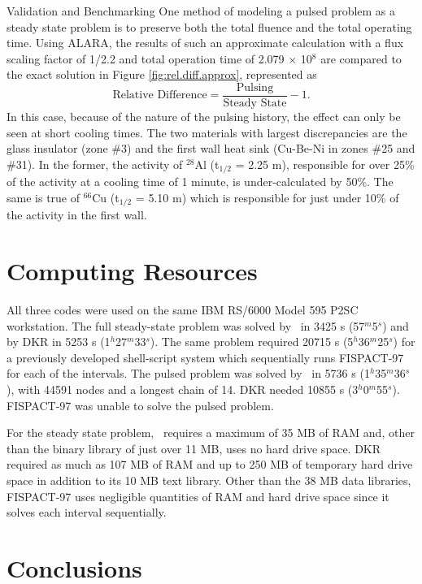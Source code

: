 \begin{chapter}{Validation and Benchmarking}
One method of modeling a pulsed problem as a steady state problem is
to preserve both the total fluence and the total operating
time\cite{bib:sisolak,bib:hosny,bib:qingming}.  Using ALARA, the
results of such an approximate calculation with a flux scaling factor
of 1/2.2 and total operation time of 2.079 $\times$ 10$^8$ are
compared to the exact solution in Figure \ref{fig:rel.diff.approx},
represented as
$$\mbox{Relative Difference} = \frac{\mbox{Pulsing}}{\mbox{Steady
    State}} - 1.$$
In this case, because of the nature of the pulsing history, the effect
can only be seen at short cooling times.  The two materials with
largest discrepancies are the glass insulator (zone \#3) and the first
wall heat sink (Cu-Be-Ni in zones \#25 and \#31).  In the former, the
activity of $^{28}$Al (t$_{1/2}$ = 2.25 m), responsible for over 25\%
of the activity at a cooling time of 1 minute, is under-calculated by
50\%.  The same is true of $^{66}$Cu (t$_{1/2}$ = 5.10 m) which is
responsible for just under 10\% of the activity in the first wall.
    


\section{Computing Resources}

All three codes were used on the same IBM RS/6000 Model 595 P2SC
workstation.  The full steady-state problem was solved by \ALARA\ in
3425 s (57$^m$5$^s$) and by DKR in 5253 s (1$^h$27$^m$33$^s$).  The
same problem required 20715 s (5$^h$36$^m$25$^s$) for a previously
developed shell-script system which sequentially runs FISPACT-97 for
each of the intervals.  The pulsed problem was solved by \ALARA\ in 5736
s (1$^h$35$^m$36$^s$), with 44591 nodes and a longest chain of 14.
DKR needed 10855 s (3$^h$0$^m$55$^s$).  FISPACT-97 was unable to solve
the pulsed problem.

For the steady state problem, \ALARA\ requires a maximum of 35 MB of RAM
and, other than the binary library of just over 11 MB, uses no hard
drive space.  DKR required as much as 107 MB of RAM and up to
250 MB of temporary hard drive space in addition to its 10 MB text
library.  Other than the 38 MB data libraries, FISPACT-97 uses
negligible quantities of RAM and hard drive space since it solves each
interval sequentially.


\section{Conclusions}


\end{chapter}
